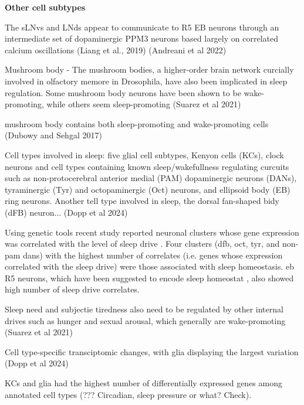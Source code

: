 \textbf{Other cell subtypes}

The sLNvs and LNds appear to communicate to R5 EB neurons through an intermediate set of dopaminergic PPM3 neurons based largely on correlated calcium oscillations (Liang et al., 2019)
\cite{andreaniCircadianProgrammingEllipsoid2022} (Andreani et al 2022)

Mushroom body - The mushroom bodies, a higher-order brain
network curcially involved in olfactory memore in Drosophila, have
also been implicated in sleep regulation. Some mushroom body neurons have been
shown to be wake-promoting, while others seem sleep-promoting \cite{suarez-grimaltNeuralArchitectureSleep2021}
(Suarez et al 2021)

mushroom body contains both sleep-promoting and wake-promoting cells
\cite{dubowyCircadianRhythmsSleep2017} (Dubowy and Sehgal 2017)

Cell types involved in sleep: five glial cell subtypes, Kenyon cells (KCs), clock neurons and cell types containing
known sleep/wakefullness regulating curcuits such as non-protocerebral anterior medial (PAM) dopaminergic neurons (DANs),
tyraminergic (Tyr) and octopaminergic (Oct) neurons, and ellipsoid body (EB) ring neurons. Another tell type involved in sleep,
the dorsal fan-shaped bidy (dFB) neuron... \cite{doppSinglecellTranscriptomicsReveals2024}
(Dopp et al 2024)

Using genetic tools recent study reported neuronal clusters whose gene expression was
correlated with the level of sleep drive
\cite{doppSinglecellTranscriptomicsReveals2024}. Four clusters (\gls{dfb}, \gls{oct}, \gls{tyr}, and non-\gls{pam} \glspl{dan}) with the highest number of
correlates (i.e. genes whose expression correlated with the sleep drive) were those associated
with sleep homeostasis. \gls{eb} R5 neurons, which have been suggested to encode sleep homeostat \cite{liuSleepDriveEncoded2016}, also showed high number
of sleep drive correlates.

Sleep need and subjectie tiredness also need to be regulated by other internal drives such as hunger and sexual arousal,
which generally are wake-promoting \cite{suarez-grimaltNeuralArchitectureSleep2021}
(Suarez et al 2021)

Cell type-specific transciptomic changes, with glia displaying the largest variation \cite{doppSinglecellTranscriptomicsReveals2024}
(Dopp et al 2024)

KCs and glia had the highest number of differentially expressed genes among
annotated cell types (??? Circadian, sleep pressure or what? Check).

